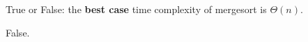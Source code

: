 \begin{prob}
    True or False: the \textbf{best case} time complexity of mergesort is $\Theta(n)$.

    \tF{}

    \begin{soln}
        False.
    \end{soln}

\end{prob}
